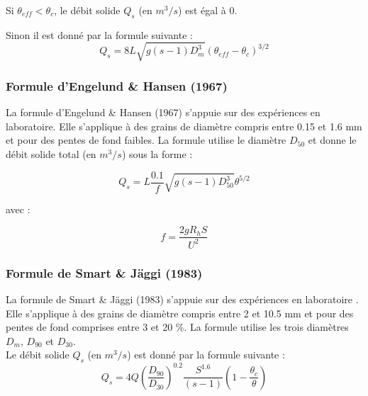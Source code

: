 \documentclass[a4paper,10pt]{article}
\begin{document}
\noindent
Si $\theta_{eff} < \theta_c$, le d\'ebit solide $Q_s$ (en $m^3/s$) est \'egal \`a 0.

\noindent
Sinon il est donn\'e par la formule suivante :
$$ Q_s = 8 L \sqrt{g (s-1) D_m^3} (\theta_{eff} - \theta_c)^{3/2} $$


\subsubsection{Formule d'Engelund \& Hansen (1967)}

\noindent
La formule d'Engelund \& Hansen (1967) s'appuie sur des exp\'eriences en laboratoire. Elle s'applique \`a des grains de diam\`etre compris entre 0.15 et 1.6 mm et pour des pentes de fond faibles. La formule utilise le diam\`etre $D_{50}$ et donne le d\'ebit solide total (en $m^3/s$) sous la forme :

$$ Q_s = L \frac{0.1}{f} \sqrt{g (s-1) D_{50}^3} \theta^{5/2} $$

avec :

$$ f = \frac{2 g R_h S}{U^2} $$



\subsubsection{Formule de Smart \& J\"aggi (1983)}

\noindent
La formule de Smart \& J\"aggi (1983) s'appuie sur des exp\'eriences en laboratoire \cite{sma1}. Elle s'applique \`a des grains de diam\`etre compris entre 2 et 10.5 mm et pour des pentes de fond comprises entre 3 et 20 \%. La formule utilise les trois diam\`etres $D_{m}$, $D_{90}$ et $D_{30}$. \\

\noindent
Le d\'ebit solide $Q_s$ (en $m^3/s$) est donn\'e par la formule suivante :
$$ Q_s = 4 Q \left(\frac{D_{90}}{D_{30}}\right)^{0.2} \frac{S^{1.6}}{(s-1)} \left(1-\frac{\theta_c}{\theta}\right) $$
\end{document}
